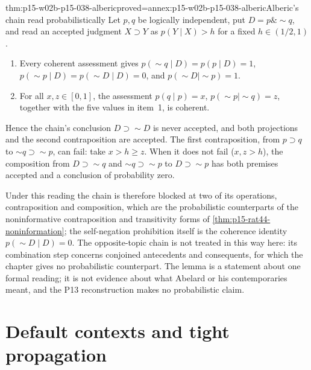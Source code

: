 \begin{hblemma}{thm:p15-w02b-p15-038-alberic}{proved=annex:p15-w02b-p15-038-alberic}{Alberic's chain read probabilistically}
Let \(p,q\) be logically independent, put
\(D=p\mathbin{\&}\sim q\), and read an accepted judgment
\(X\supset Y\) as \(p(Y\mid X)>h\) for a fixed \(h\in(1/2,1)\).
\begin{enumerate}
\item Every coherent assessment gives
      \(p(\sim q\mid D)=p(p\mid D)=1\),
      \(p(\sim p\mid D)=p(\sim D\mid D)=0\), and
      \(p(\sim D\mid\sim p)=1\).
\item For all \(x,z\in[0,1]\), the assessment
      \(p(q\mid p)=x\), \(p(\sim p\mid\sim q)=z\), together with the
      five values in item~1, is coherent.
\end{enumerate}
Hence the chain's conclusion \(D\supset\sim D\) is never accepted, and
both projections and the second contraposition are accepted. The first
contraposition, from \(p\supset q\) to \(\sim q\supset\sim p\), can
fail: take \(x>h\geq z\). When it does not fail (\(x,z>h\)), the
composition from \(D\supset\sim q\) and \(\sim q\supset\sim p\) to
\(D\supset\sim p\) has both premises accepted and a conclusion of
probability zero.
\end{hblemma}

Under this reading the chain is therefore blocked at two of its
operations, contraposition and composition, which are the probabilistic
counterparts of the noninformative contraposition and transitivity forms
of \cref{thm:p15-rat44-noninformation}; the self-negation prohibition
itself is the coherence identity \(p(\sim D\mid D)=0\). The
opposite-topic chain is not treated in this way here: its combination
step concerns conjoined antecedents and consequents, for which the
chapter gives no probabilistic counterpart. The lemma is a statement
about one formal reading; it is not evidence about what Abelard or his
contemporaries meant, and the P13 reconstruction makes no probabilistic
claim.

\section{Default contexts and tight propagation}

